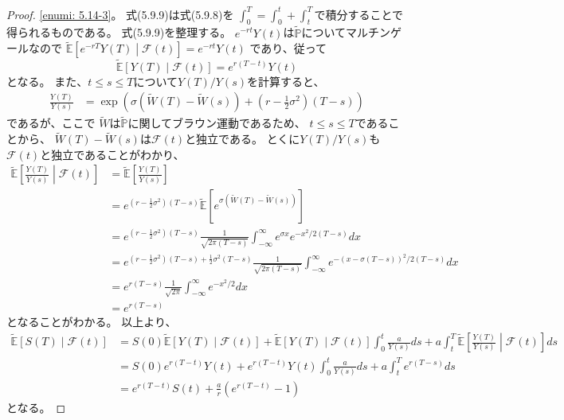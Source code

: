 \documentclass[uplatex]{jsarticle}
\theoremstyle{definition}
\def\P{\mathbb{P}}
\def\E{\mathbb{E}}
\def\mcF{\mathcal{F}}
\begin{document}
\begin{proof}
  \ref{enumi: 5.14-3}。
  式(5.9.9)は式(5.9.8)を
  \(\int_0^T = \int_0^t + \int_t^T\)で積分することで得られるものである。
  式(5.9.9)を整理する。
  \(e^{-rt}Y(t)\)は\(\tilde{\P}\)についてマルチンゲールなので
  \(
  \tilde{\E}\left[ e^{-rT}Y(T) \middle| \mcF(t)\right]
  = e^{-rt}Y(t)
  \)
  であり、従って
  \[\tilde{\E}[Y(T)\mid \mcF(t)] = e^{r(T-t)}Y(t)\]
  となる。
  また、\(t\leq s\leq T\)について\(Y(T)/Y(s)\)を計算すると、
  \begin{align*}
    \frac{Y(T)}{Y(s)}
    &= \exp \left( \sigma (\tilde{W}(T) - \tilde{W}(s))
    + \left( r-\frac{1}{2}\sigma^2 \right) (T-s)\right)
  \end{align*}
  であるが、ここで
  \(\tilde{W}\)は\(\tilde{\P}\)に関してブラウン運動であるため、
  \(t\leq s \leq T\)であることから、
  \(\tilde{W}(T) - \tilde{W}(s)\)は\(\mcF(t)\)と独立である。
  とくに\(Y(T)/Y(s)\)も\(\mcF(t)\)と独立であることがわかり、
  \begin{align*}
    \tilde{\E}\left[ \frac{Y(T)}{Y(s)} \middle| \mcF(t) \right]
    &= \tilde{\E} \left[ \frac{Y(T)}{Y(s)} \right] \\
    &= e^{\left( r-\frac{1}{2}\sigma^2 \right) (T-s)}
    \tilde{\E} \left[
    e^{\sigma (\tilde{W}(T) - \tilde{W}(s))}\right] \\
    &= e^{\left( r-\frac{1}{2}\sigma^2 \right) (T-s)}
    \frac{1}{\sqrt{2\pi (T-s)}}
    \int_{-\infty}^\infty e^{\sigma x}e^{-x^2/2(T-s)}dx \\
    &= e^{\left( r-\frac{1}{2}\sigma^2 \right) (T-s)
    + \frac{1}{2}\sigma^2(T-s)}
    \frac{1}{\sqrt{2\pi (T-s)}}
    \int_{-\infty}^\infty e^{-(x-\sigma(T-s))^2/2(T-s)}dx \\
    &= e^{r(T-s)}
    \frac{1}{\sqrt{2\pi}}
    \int_{-\infty}^\infty e^{-x^2/2}dx \\
    &= e^{r(T-s)}
  \end{align*}
  となることがわかる。
  以上より、
  \begin{align*}
    \tilde{\E} \left[S(T)\middle| \mcF(t)\right]
    &= S(0)\tilde{\E} \left[ Y(T)\middle| \mcF(t)\right]
    + \tilde{\E} \left[Y(T)\middle| \mcF(t)\right]
    \int_0^t\frac{a}{Y(s)}ds
    + a\int_t^T\tilde{\E} \left[
    \frac{Y(T)}{Y(s)}\middle| \mcF(t)\right] ds \\
    &= S(0)e^{r(T-t)}Y(t)
    + e^{r(T-t)}Y(t)\int_0^t\frac{a}{Y(s)}ds
    + a\int_t^T e^{r(T-s)} ds \\
    &= e^{r(T-t)}S(t)
    + \frac{a}{r}(e^{r(T-t)}-1)
  \end{align*}
  となる。


\end{proof}
\end{document}
